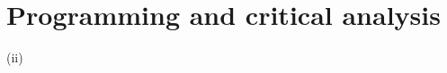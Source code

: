 \documentclass{exam}
\begin{document}
    \section{Programming and critical analysis}
    \begin{questions}
        \setcounter{question}{4}
        \item
        \begin{parts}
            \item  \hspace{21em} (ii)
            \vspace{-1.2em}
            \begin{figure}[H]
                \centering
                \qquad

\end{figure}
\end{parts}
\end{questions}
\end{document}
